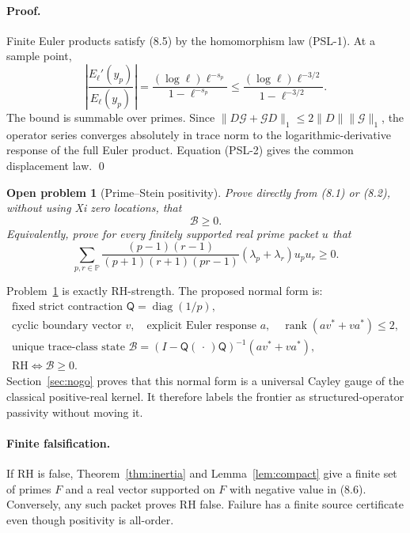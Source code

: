 \documentclass[11pt]{article}
\newtheorem{problem}[theorem]{Open problem}
\theoremstyle{definition}
\theoremstyle{remark}
\newcommand{\PP}{\mathbb P}
\newcommand{\cB}{\mathcal B}
\newcommand{\cG}{\mathcal G}
\newcommand{\diag}{\operatorname{diag}}
\newcommand{\rank}{\operatorname{rank}}
\newcommand{\norm}[1]{\lVert #1\rVert}
\begin{document}
\paragraph{Proof.}
Finite Euler products satisfy (8.5) by the homomorphism law (PSL-1).  At a sample point,
\[
 \left|\frac{E_\ell'(y_p)}{E_\ell(y_p)}\right|
 =\frac{(\log\ell)\ell^{-s_p}}{1-\ell^{-s_p}}
 \leq\frac{(\log\ell)\ell^{-3/2}}{1-\ell^{-3/2}}.
\]
The bound is summable over primes.  Since
$\norm{D\cG+\cG D}_1\leq2\norm D\norm{\cG}_1$, the operator series converges absolutely in trace
norm to the logarithmic-derivative response of the full Euler product.  Equation (PSL-2) gives
the common displacement law. \qed

\begin{problem}[Prime--Stein positivity]
\label{prob:prime-stein}
Prove directly from \emph{(8.1)} or \emph{(8.2)}, without using Xi zero locations, that
\begin{equation}
 \cB\geq0.                                                  \tag{PS}
\end{equation}
Equivalently, prove for every finitely supported real prime packet $u$ that
\begin{equation}
 \sum_{p,r\in\PP}
 \frac{(p-1)(r-1)}
 {(p+1)(r+1)(pr-1)}
 (\lambda_p+\lambda_r)u_pu_r\geq0.                         \tag{8.6}
\end{equation}
\end{problem}

Problem~\ref{prob:prime-stein} is exactly RH-strength.  The proposed normal form is:
\begin{equation}
 \begin{gathered}
 \text{fixed strict contraction }\mathsf Q=\diag(1/p),\\
 \text{cyclic boundary vector }v,\quad
 \text{explicit Euler response }a,\quad
 \rank(av^*+va^*)\leq2,\\
 \text{unique trace-class state }
 \cB=(I-\mathsf Q(\,\cdot\,)\mathsf Q)^{-1}(av^*+va^*),\\
 \mathrm{RH}\Longleftrightarrow\cB\geq0.
 \end{gathered}                                             \tag{8.7}
\end{equation}
Section~\ref{sec:nogo} proves that this normal form is a universal Cayley gauge of the classical
positive-real kernel.  It therefore labels the frontier as structured-operator passivity without
moving it.

\paragraph{Finite falsification.}
If RH is false, Theorem~\ref{thm:inertia} and Lemma~\ref{lem:compact} give a finite set of primes
$F$ and a real vector supported on $F$ with negative value in (8.6).  Conversely, any such packet
proves RH false.  Failure has a finite source certificate even though positivity is all-order.
\end{document}
